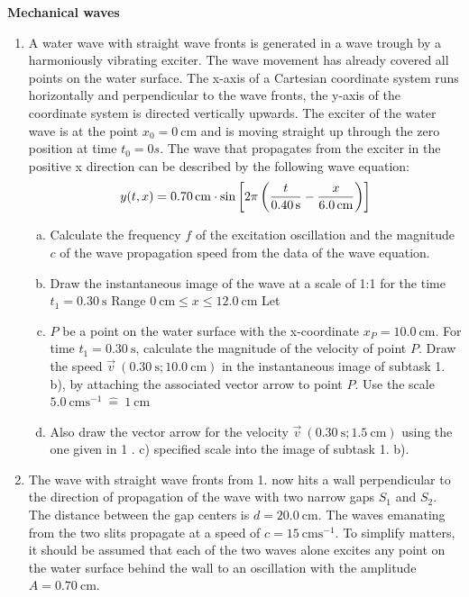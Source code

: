 \documentclass[a4paper]{article}
\begin{document}
	{\bf Mechanical waves }\\
	\begin{enumerate}[1.]
		\item A water wave with straight wave fronts is generated in a wave trough by a harmoniously vibrating exciter. The wave movement has already covered all points on the water surface. The x-axis of a Cartesian coordinate system runs horizontally and perpendicular to the wave fronts, the y-axis of the coordinate system is directed vertically upwards. The exciter of the water wave is at the point $x_0=\SI{0}{\centi\meter}$ and is moving straight up through the zero position at time $t_0=0s$. The wave that propagates from the exciter in the positive x direction can be described by the following wave equation:
		$$y(t,x)=\SI{0.70}{\centi\meter} \cdot \sin{ \left[ 2 \pi \left( {t \over \SI{0.40}{\second }}-{x \over \SI{6,0}{\centi\meter}} \right) \right]}$$
		
		\begin{enumerate}[a)]
			\item Calculate the frequency $f$ of the excitation oscillation and the magnitude $c$ of the wave propagation speed from the data of the wave equation.
			\item Draw the instantaneous image of the wave at a scale of 1:1 for the time $t_1=\SI{0.30}{\second}$
			Range $ \SI{0}{\centi\meter} \le x \le \SI{12,0}{\centi\meter}$
			Let \item $P$ be a point on the water surface with the x-coordinate $x_P=\SI{10,0}{\centi\meter}$. For time $t_1=\SI{0.30}{\second}$, calculate the magnitude of the velocity of point $P$. Draw the speed $\vec{v}~ (\SI{0.30}{\second}; \SI{10.0}{\centi\meter})$ in the instantaneous image of subtask 1. b), by attaching the associated vector arrow to point $P$. Use the scale
			$\SI{5,0}{\centi\meter\second^{-1}} ~\hat{=} ~\SI{1}{\centi\meter}$
			\item Also draw the vector arrow for the velocity $\vec{v} ~(\SI{0.30}{\second}; \SI{1.5}{\centi\meter})$ using the one given in 1 . c) specified scale into the image of subtask 1. b).
		\end{enumerate}
		
		\item The wave with straight wave fronts from 1. now hits a wall perpendicular to the direction of propagation of the wave with two narrow gaps $S_1$ and $S_2$. The distance between the gap centers is $d=\SI{20,0}{\centi\meter}$. The waves emanating from the two slits propagate at a speed of $c=\SI{15}{\centi\meter\second^{-1}}$. To simplify matters, it should be assumed that each of the two waves alone excites any point on the water surface behind the wall to an oscillation with the amplitude $A=\SI{0.70}{\centi\meter}$.
		

\end{enumerate}
\end{document}
